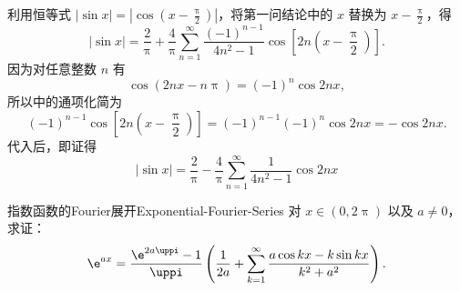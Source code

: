 \begin{myproof}
\begin{center}
    \end{center}

    利用恒等式 $|\sin x| = \left| \cos\left( x - \frac{\uppi}{2} \right) \right|$，将第一问结论中的 $x$ 替换为 $x - \frac{\uppi}{2}$，得
    \begin{equation}\label{eq:abs-sin-sub}
        |\sin x| = \frac{2}{\uppi} + \frac{4}{\uppi} \sum_{n=1}^{\infty} \frac{(-1)^{n-1}}{4n^2 - 1} \cos\left[ 2n\left( x - \frac{\uppi}{2} \right) \right].
    \end{equation}
    因为对任意整数 $n$ 有
    \begin{equation}\label{eq:cos-shift-identity}
        \cos(2nx - n\uppi) = (-1)^n \cos 2nx,
    \end{equation}
    所以中的通项化简为
    \begin{equation}\label{eq:abs-sin-term}
        (-1)^{n-1} \cos\left[ 2n\left( x - \frac{\uppi}{2} \right) \right] = (-1)^{n-1}(-1)^n \cos 2nx = -\cos 2nx.
    \end{equation}
    代入后，即证得
    \begin{equation}
        \boxed{|\sin x| = \frac{2}{\uppi} - \frac{4}{\uppi} \sum_{n=1}^{\infty} \frac{1}{4n^2 - 1} \cos 2nx}
    \end{equation}
\end{myproof}

\begin{problem}{指数函数的Fourier展开}{Exponential-Fourier-Series}
    对 $x \in (0, 2\uppi)$ 以及 $a \neq 0$，求证：
    \begin{equation*}
        \e^{ax} = \frac{\e^{2a\uppi} - 1}{\uppi} \left( \frac{1}{2a} + \sum_{k=1}^{\infty} \frac{a \cos kx - k \sin kx}{k^2 + a^2} \right).
    \end{equation*}
\end{problem}

